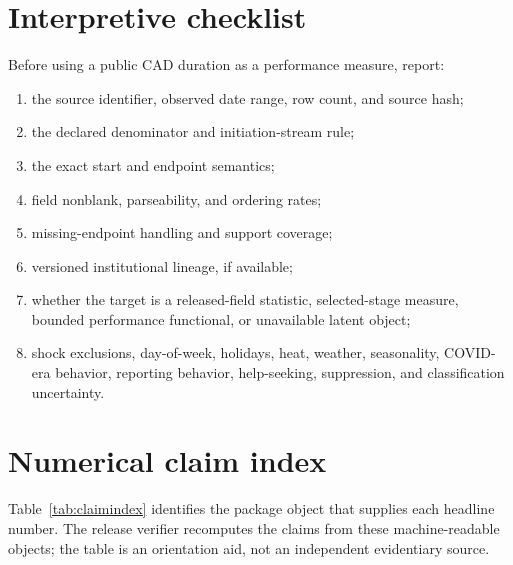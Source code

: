 \documentclass[11pt]{article}
\begin{document}
\section{Interpretive checklist}

Before using a public CAD duration as a performance measure, report:
\begin{enumerate}
\item the source identifier, observed date range, row count, and source hash;
\item the declared denominator and initiation-stream rule;
\item the exact start and endpoint semantics;
\item field nonblank, parseability, and ordering rates;
\item missing-endpoint handling and support coverage;
\item versioned institutional lineage, if available;
\item whether the target is a released-field statistic, selected-stage measure, bounded performance functional, or unavailable latent object;
\item shock exclusions, day-of-week, holidays, heat, weather, seasonality, COVID-era behavior, reporting behavior, help-seeking, suppression, and classification uncertainty.
\end{enumerate}



\clearpage

\section{Numerical claim index}

Table~\ref{tab:claimindex} identifies the package object that supplies each headline number. The release verifier recomputes the claims from these machine-readable objects; the table is an orientation aid, not an independent evidentiary source.
\end{document}
